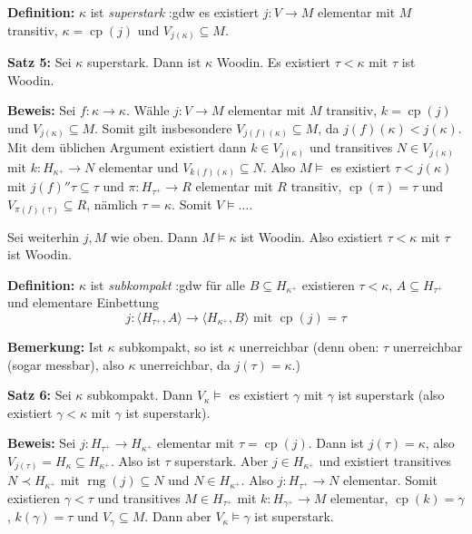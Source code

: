 \documentclass[a4paper,fontsize=11pt]{scrartcl}
\newcommand{\rng}{\operatorname{rng}}
\newcommand{\cp}{\operatorname{cp}}
\begin{document}
{\bf Definition:} $\kappa$ ist {\em superstark} :gdw es existiert $j\colon V\to M$ elementar mit $M$ transitiv, $\kappa=\cp(j)$ und $V_{j(\kappa)}\subseteq M$.

{\bf Satz 5:} Sei $\kappa$ superstark.
	Dann ist $\kappa$ Woodin.
	Es existiert $\tau<\kappa$ mit $\tau$ ist Woodin.

	{\bf Beweis:} Sei $f\colon \kappa\to\kappa$.
		Wähle $j\colon V\to M$ elementar mit $M$ transitiv, $k=\cp(j)$ und $V_{j(\kappa)}\subseteq M$.
		Somit gilt insbesondere $V_{j(f)(\kappa)}\subseteq M$, da $j(f)(\kappa)<j(\kappa)$.
		Mit dem üblichen Argument existiert dann $k\in V_{j(\kappa)}$ und transitives $N\in V_{j(\kappa)}$ mit $k\colon H_{\kappa^+}\to N$ elementar und $V_{k(f)(\kappa)}\subseteq N$.
		Also $M\models$ es existiert $\tau< j(\kappa)$ mit $j(f)''\tau\subseteq\tau$ und $\pi\colon H_{\tau^+}\to R$ elementar mit $R$ transitiv, 
		$\cp(\pi)=\tau$ und $V_{\pi(f)(\tau)}\subseteq R$, nämlich $\tau=\kappa$.
		Somit $V\models\ldots$.

Sei weiterhin $j,M$ wie oben. Dann $M\models\kappa$ ist Woodin. Also existiert $\tau<\kappa$ mit $\tau$ ist Woodin.

{\bf Definition:} $\kappa$ ist {\em subkompakt} :gdw für alle $B\subseteq H_{\kappa^+}$ existieren $\tau<\kappa$, $A\subseteq H_{\tau^+}$ und elementare Einbettung \[j\colon\langle H_{\tau^+}, A\rangle\to\langle H_{\kappa^+}, B\rangle \mbox{ mit } \cp(j)=\tau\]

{\bf Bemerkung:}	Ist $\kappa$ subkompakt, so ist $\kappa$ unerreichbar 
	(denn oben: $\tau$ unerreichbar (sogar messbar), also $\kappa$ unerreichbar, da $j(\tau)=\kappa$.)

{\bf Satz 6:} Sei $\kappa$ subkompakt.
	Dann $V_{\kappa}\models$ es existiert $\gamma$ mit $\gamma$ ist superstark
	(also existiert $\gamma<\kappa$ mit $\gamma$ ist superstark).

	{\bf Beweis:} Sei $j\colon H_{\tau^+}\to H_{\kappa^+}$ elementar mit $\tau=\cp(j)$.
		Dann ist $j(\tau)=\kappa$, also $V_{j(\tau)}=H_{\kappa}\subseteq H_{\kappa^+}$.
		Also ist $\tau$ superstark.
		Aber $j\in H_{\kappa^+}$ und existiert transitives $N\prec H_{\kappa^+}$ mit $\rng(j)\subseteq N$ und $N\in H_{\kappa^+}$.
		Also $j\colon H_{\tau^+}\to N$ elementar.
		Somit existieren $\gamma<\tau$ und transitives $M\in H_{\tau^+}$ mit $k\colon H_{\gamma^+}\to M$ elementar, $\cp(k)=\gamma$,
		$k(\gamma)=\tau$ und $V_{\gamma}\subseteq M$.
		Dann aber $V_{\kappa}\models\gamma$ ist superstark.
\end{document}
